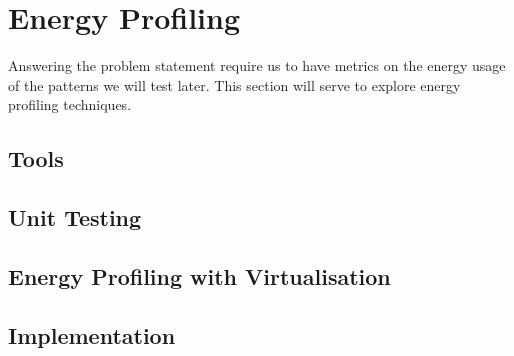 \chapter{Energy Profiling}\label{ch:profiling}

Answering the problem statement require us to have metrics on the energy usage of the patterns we will test later.
This section will serve to explore energy profiling techniques.


\section{Tools}\label{sec:tools}



\section{Unit Testing}\label{sec:unit-testing}



\section{Energy Profiling with Virtualisation}\label{sec:energy-profiling-with-virtualisation}


\section{Implementation}\label{sec:implementation}
